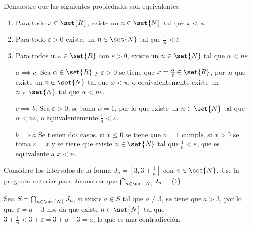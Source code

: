 \documentclass{ayudantia}
\begin{document}
\begin{prob}
    Demuestre que las siguientes propiedades son equivalentes:
    \begin{enumerate}[label=(\alph*)]
        \item Para todo \(x\in\set{R}\), existe un \(n\in\set{N}\) tal que \(x<n\).
        \item Para todo \(\varepsilon>0\) existe, un \(n\in\set{N}\) tal que \(\frac1n<\varepsilon\).
        \item Para todos \(\alpha,\varepsilon\in\set{R}\) con \(\varepsilon>0\), existe un \(n\in\set{N}\) tal que \(\alpha<n\varepsilon\).
    \end{enumerate}
\end{prob}

\begin{ans}
    \begin{sol}
        \begin{itemize}
            \item[\(a\implies c\):] Sea \(\alpha\in\set{R}\) y \(\varepsilon>0\) se tiene que \(x=\frac\alpha\varepsilon\in\set{R}\), por lo que existe un \(n\in\set{N}\) tal que \(x<n\), o equivalentemente existe un \(n\in\set{N}\) tal que \(\alpha<n\varepsilon\).
            \item[\(c\implies b\):] Sea \(\varepsilon>0\), se toma \(\alpha=1\), por lo que existe un \(n\in\set{N}\) tal que \(\alpha<n\varepsilon\), o equivalentemente \(\frac1n<\varepsilon\).
            \item[\(b\implies a\)] Se tienen dos casos, si \(x\leq0\) se tiene que \(n=1\) cumple, si \(x>0\) se toma \(\varepsilon=x\) y se tiene que existe \(n\in\set{N}\) tal que \(\frac1n<\varepsilon\), que es equivalente a \(x<n\).
        \end{itemize}
    \end{sol}
\end{ans}


\begin{prob}
    Considere los intervalos de la forma \(J_n=[3,3+\frac1n]\) con \(n\in\set{N}\). Use la pregunta anterior para demostrar que \(\bigcap_{n\in\set{N}}J_n=\{3\}\).
\end{prob}

\begin{ans}
    \begin{sol}
        Sea \(S=\bigcap_{n\in\set{N}}J_n\), si existe \(a\in S\) tal que \(a\neq 3\), se tiene que \(a>3\), por lo que \(\varepsilon=a-3\) nos da que existe \(n\in\set{N}\) tal que \(3+\frac1n<3+\varepsilon=3+a-3=a\), lo que es una contradicción.
    \end{sol}
\end{ans}
\end{document}
